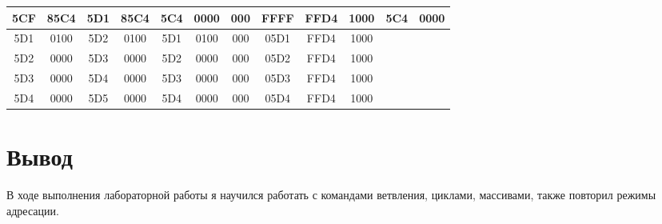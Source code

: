 \begin{center}
\begin{tabular}{|c|c|c|c|c|c|c|c|c|c|c|c|}
5CF & 85C4 & 5D1 & 85C4 & 5C4 & 0000 & 000 & FFFF & FFD4 & 1000 & 5C4 & 0000 \\ \hline
5D1 & 0100 & 5D2 & 0100 & 5D1 & 0100 & 000 & 05D1 & FFD4 & 1000 &  &  \\ \hline
5D2 & 0000 & 5D3 & 0000 & 5D2 & 0000 & 000 & 05D2 & FFD4 & 1000 &  &  \\ \hline
5D3 & 0000 & 5D4 & 0000 & 5D3 & 0000 & 000 & 05D3 & FFD4 & 1000 &  &  \\ \hline
5D4 & 0000 & 5D5 & 0000 & 5D4 & 0000 & 000 & 05D4 & FFD4 & 1000 &  &  \\ \hline
\end{tabular}
\end{center}

\section{Вывод}
В ходе выполнения лабораторной работы я научился работать с командами ветвления, циклами, массивами, также повторил режимы адресации.


